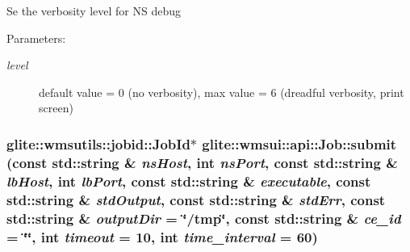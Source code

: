 Se the verbosity level for NS debug \begin{Desc}
\item[Parameters:]
\begin{description}
\item[{\em level}]default value = 0 (no verbosity), max value = 6 (dreadful verbosity, print screen) \end{description}
\end{Desc}
\hypertarget{classglite_1_1wmsui_1_1api_1_1Job_z25_0}{
\subsubsection[submit]{\setlength{\rightskip}{0pt plus 5cm}glite::wmsutils::jobid::Job\-Id$\ast$ glite::wmsui::api::Job::submit (const std::string \& {\em ns\-Host}, int {\em ns\-Port}, const std::string \& {\em lb\-Host}, int {\em lb\-Port}, const std::string \& {\em executable}, const std::string \& {\em std\-Output}, const std::string \& {\em std\-Err}, const std::string \& {\em output\-Dir} = \char`\"{}/tmp\char`\"{}, const std::string \& {\em ce\_\-id} = \char`\"{}\char`\"{}, int {\em timeout} = 10, int {\em time\_\-interval} = 60)}}
\label{classglite_1_1wmsui_1_1api_1_1Job_z25_0}



